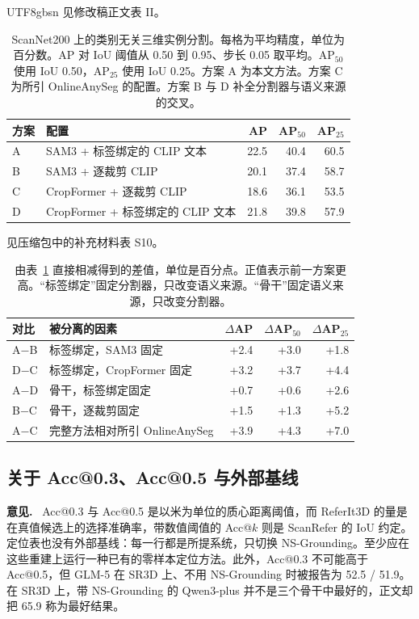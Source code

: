 \documentclass[11pt]{article}
\newcommand{\revcomment}[1]{%
  \par\vspace{0.6em}\noindent\textcolor{revblue}{\textbf{意见.}}\ %
  \textcolor{revblue}{#1}\par\vspace{0.4em}}
\begin{document}
\begin{CJK*}{UTF8}{gbsn}
\noindent 见修改稿正文表 II。

\begin{table}[ht]
\centering
\caption{ScanNet200 上的类别无关三维实例分割。每格为平均精度，单位为百分数。AP 对 IoU 阈值从 0.50 到 0.95、步长 0.05 取平均。AP\(_{50}\) 使用 IoU 0.50，AP\(_{25}\) 使用 IoU 0.25。方案 A 为本文方法。方案 C 为所引 OnlineAnySeg 的配置。方案 B 与 D 补全分割器与语义来源的交叉。}
\label{tab:recon}
\small
\begin{tabular}{llrrr}
\toprule
方案 & 配置 & AP & AP\(_{50}\) & AP\(_{25}\) \\
\midrule
A & SAM3 + 标签绑定的 CLIP 文本 & 22.5 & 40.4 & 60.5 \\
B & SAM3 + 逐裁剪 CLIP & 20.1 & 37.4 & 58.7 \\
C & CropFormer + 逐裁剪 CLIP & 18.6 & 36.1 & 53.5 \\
D & CropFormer + 标签绑定的 CLIP 文本 & 21.8 & 39.8 & 57.9 \\
\bottomrule
\end{tabular}
\end{table}

\noindent 见压缩包中的补充材料表 S10。

\begin{table}[ht]
\centering
\caption{由表~\ref{tab:recon} 直接相减得到的差值，单位是百分点。正值表示前一方案更高。“标签绑定”固定分割器，只改变语义来源。“骨干”固定语义来源，只改变分割器。}
\label{tab:recondiff}
\small
\begin{tabular}{llrrr}
\toprule
对比 & 被分离的因素 & \(\Delta\)AP & \(\Delta\)AP\(_{50}\) & \(\Delta\)AP\(_{25}\) \\
\midrule
A\(-\)B & 标签绑定，SAM3 固定 & +2.4 & +3.0 & +1.8 \\
D\(-\)C & 标签绑定，CropFormer 固定 & +3.2 & +3.7 & +4.4 \\
A\(-\)D & 骨干，标签绑定固定 & +0.7 & +0.6 & +2.6 \\
B\(-\)C & 骨干，逐裁剪固定 & +1.5 & +1.3 & +5.2 \\
A\(-\)C & 完整方法相对所引 OnlineAnySeg & +3.9 & +4.3 & +7.0 \\
\bottomrule
\end{tabular}
\end{table}

\subsection*{关于 Acc@0.3、Acc@0.5 与外部基线}

\revcomment{Acc@0.3 与 Acc@0.5 是以米为单位的质心距离阈值，而 ReferIt3D 的量是在真值候选上的选择准确率，带数值阈值的 Acc@\(k\) 则是 ScanRefer 的 IoU 约定。定位表也没有外部基线：每一行都是所提系统，只切换 NS-Grounding。至少应在这些重建上运行一种已有的零样本定位方法。此外，Acc@0.3 不可能高于 Acc@0.5，但 GLM-5 在 SR3D 上、不用 NS-Grounding 时被报告为 52.5 / 51.9。在 SR3D 上，带 NS-Grounding 的 Qwen3-plus 并不是三个骨干中最好的，正文却把 65.9 称为最好结果。}


\end{CJK*}
\end{document}
